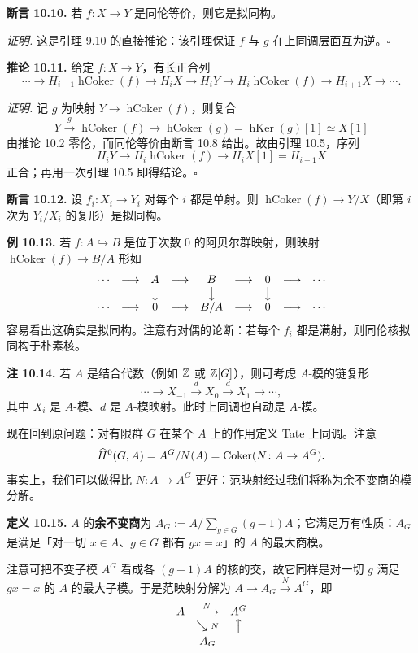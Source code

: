\textbf{断言 10.10.} 若 $f\colon X\to Y$ 是同伦等价，则它是拟同构。

\textit{证明.} 这是引理 9.10 的直接推论：该引理保证 $f$ 与 $g$ 在上同调层面互为逆。\hfill$\square$

\textbf{推论 10.11.} 给定 $f\colon X\to Y$，有长正合列
\[
\cdots\to H_{i-1}\operatorname{hCoker}(f)\to H_iX\to H_iY\to H_i\operatorname{hCoker}(f)\to H_{i+1}X\to\cdots.
\]

\textit{证明.} 记 $g$ 为映射 $Y\to\operatorname{hCoker}(f)$，则复合
\[
Y\xrightarrow{\ g\ }\operatorname{hCoker}(f)\to\operatorname{hCoker}(g)=\operatorname{hKer}(g)[1]\simeq X[1]
\]
由推论 10.2 零伦，而同伦等价由断言 10.8 给出。故由引理 10.5，序列
\[
H_iY\to H_i\operatorname{hCoker}(f)\to H_iX[1]=H_{i+1}X
\]
正合；再用一次引理 10.5 即得结论。\hfill$\square$

\textbf{断言 10.12.} 设 $f_i\colon X_i\to Y_i$ 对每个 $i$ 都是单射。则 $\operatorname{hCoker}(f)\to Y/X$（即第 $i$ 次为 $Y_i/X_i$ 的复形）是拟同构。

\textbf{例 10.13.} 若 $f\colon A\hookrightarrow B$ 是位于次数 $0$ 的阿贝尔群映射，则映射 $\operatorname{hCoker}(f)\to B/A$ 形如
\[
\begin{array}{ccccccccc}
\cdots & \longrightarrow & A & \longrightarrow & B & \longrightarrow & 0 & \longrightarrow & \cdots\\
& & \big\downarrow & & \big\downarrow & & \big\downarrow & & \\
\cdots & \longrightarrow & 0 & \longrightarrow & B/A & \longrightarrow & 0 & \longrightarrow & \cdots
\end{array}
\]
容易看出这确实是拟同构。注意有对偶的论断：若每个 $f_i$ 都是满射，则同伦核拟同构于朴素核。

\textbf{注 10.14.} 若 $A$ 是结合代数（例如 $\mathbb{Z}$ 或 $\mathbb{Z}[G]$），则可考虑 $A$-模的链复形
\[
\cdots\to X_{-1}\xrightarrow{\ d\ }X_0\xrightarrow{\ d\ }X_1\to\cdots,
\]
其中 $X_i$ 是 $A$-模、$d$ 是 $A$-模映射。此时上同调也自动是 $A$-模。

现在回到原问题：对有限群 $G$ 在某个 $A$ 上的作用定义 Tate 上同调。注意
\[
\widehat{H}^0(G,A)=A^G/N(A)=\operatorname{Coker}(N\colon A\to A^G).
\]
事实上，我们可以做得比 $N\colon A\to A^G$ 更好：范映射经过我们将称为余不变商的模分解。

\textbf{定义 10.15.} $A$ 的\textbf{余不变商}为 $A_G:=A/\sum_{g\in G}(g-1)A$；它满足万有性质：$A_G$ 是满足「对一切 $x\in A$、$g\in G$ 都有 $gx=x$」的 $A$ 的最大商模。

注意可把不变子模 $A^G$ 看成各 $(g-1)A$ 的核的交，故它同样是对一切 $g$ 满足 $gx=x$ 的 $A$ 的最大子模。于是范映射分解为 $A\to A_G\xrightarrow{N}A^G$，即
\[
\begin{array}{ccc}
A & \xrightarrow{\ N\ } & A^G\\
& \searrow{\scriptstyle N} & \big\uparrow\\[2pt]
& A_G &
\end{array}
\]

